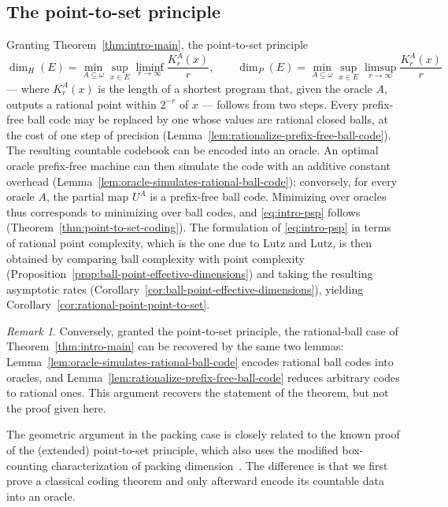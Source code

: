 \documentclass[a4paper,oneside,reqno,12pt]{amsart}
\theoremstyle{plain}
\theoremstyle{definition}
\theoremstyle{remark}
\newtheorem{remark}[theorem]{Remark}
\begin{document}
\subsection*{The point-to-set principle}

Granting Theorem~\ref{thm:intro-main}, the point-to-set principle
\begin{equation}
\label{eq:intro-psp}
\dim_H(E)
=
\min_{A\subseteq\omega}
\sup_{x\in E}
\liminf_{r\to\infty}\frac{K^A_r(x)}{r},
\qquad
\dim_P(E)
=
\min_{A\subseteq\omega}
\sup_{x\in E}
\limsup_{r\to\infty}\frac{K^A_r(x)}{r}
\end{equation}
--- where \(K^A_r(x)\) is the length of a shortest program that, given the oracle
\(A\), outputs a rational point within \(2^{-r}\) of \(x\) --- follows from two
steps.
Every prefix-free ball code may be replaced by
one whose values are rational closed balls, at the cost of one step of precision
(Lemma~\ref{lem:rationalize-prefix-free-ball-code}).
The resulting countable codebook can be encoded into an oracle.  An optimal
oracle prefix-free machine can then simulate the code with an additive constant
overhead
(Lemma~\ref{lem:oracle-simulates-rational-ball-code}); conversely, for every
oracle \(A\), the partial map \(U^A\) is a prefix-free ball code.
Minimizing over oracles thus corresponds to minimizing over ball codes, and
\eqref{eq:intro-psp}
follows (Theorem~\ref{thm:point-to-set-coding}).
The formulation of
\eqref{eq:intro-psp} in terms of rational point complexity, which is the one due
to Lutz and Lutz, is then obtained by comparing ball complexity with point
complexity (Proposition~\ref{prop:ball-point-effective-dimensions}) and taking
the resulting asymptotic rates
(Corollary~\ref{cor:ball-point-effective-dimensions}), yielding
Corollary~\ref{cor:rational-point-point-to-set}.

\begin{remark}\label{rem:recovered}
Conversely, granted the point-to-set principle, the rational-ball case of
Theorem~\ref{thm:intro-main} can be recovered by the same two lemmas:
Lemma~\ref{lem:oracle-simulates-rational-ball-code} encodes rational ball codes
into oracles, and Lemma~\ref{lem:rationalize-prefix-free-ball-code} reduces
arbitrary codes to rational ones.  This argument recovers the statement of the
theorem, but not the proof given here.
\end{remark}

The geometric argument in the packing case is closely related to the known
proof of the (extended) point-to-set principle,
which also uses the modified box-counting characterization of packing
dimension~\cite{LutzLutzMayordomo2023}.
The difference is that we first prove
a classical coding theorem and only afterward encode its countable data into an
oracle.
\end{document}
